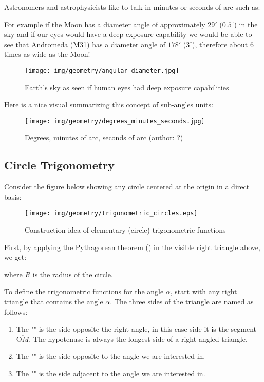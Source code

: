 	Astronomers and astrophysicists like to talk in minutes or seconds of arc such as:
	
	For example if the Moon has a diameter angle of approximately $29'$ ($0.5^\circ$) in the sky and if our eyes would have a deep exposure capability we would be able to see that Andromeda (M31) has a diameter angle of $178'$ ($3^\circ$), therefore about $6$ times as wide as the Moon!
	\begin{figure}[H]
		\centering
		\texttt{[image: img/geometry/angular\_diameter.jpg]}
		\caption[]{Earth's sky as seen if human eyes had deep exposure capabilities}
	\end{figure}
	Here is a  nice visual summarizing this concept of sub-angles units:
	\begin{figure}[H]
		\centering
		\texttt{[image: img/geometry/degrees\_minutes\_seconds.jpg]}
		\caption[Degrees, minutes of arc, seconds of arc]{Degrees, minutes of arc, seconds of arc (author: ?)}
	\end{figure}

	\pagebreak
	\subsection{Circle Trigonometry}\label{circle trigonometry}
	Consider the figure below showing any circle centered at the origin in a direct basis:		
	\begin{figure}[H]
		\centering
		\texttt{[image: img/geometry/trigonometric\_circles.eps]}
		\caption{Construction idea of elementary (circle) trigonometric functions}
	\end{figure}

	First, by applying the Pythagorean theorem () in the visible right triangle above, we get:
	
where $R$ is the radius of the circle.

	To define the trigonometric functions for the angle $\alpha$, start with any right triangle that contains the angle $\alpha$. The three sides of the triangle are named as follows:
	\begin{enumerate}
		\item The "" is the side opposite the right angle, in this case side it is the segment $\overline{\text{O}M}$. The hypotenuse is always the longest side of a right-angled triangle.
		
		\item The "" is the side opposite to the angle we are interested in.
		
		\item The "" is the side adjacent to the angle we are interested in.
	\end{enumerate}

